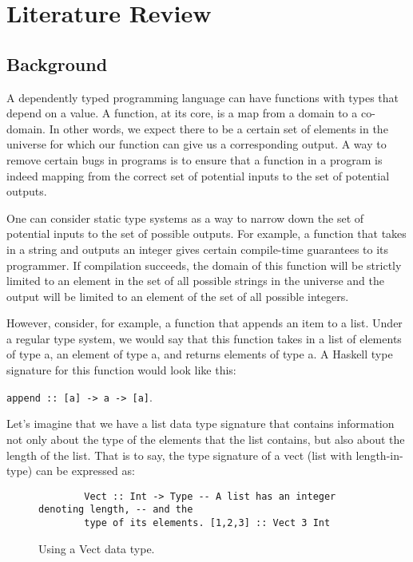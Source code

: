 
\chapter{Literature Review}

\section{Background}
A dependently typed programming language can have functions with types that
depend on a value. A function, at its core, is a map from a domain to a
co-domain. In other words, we expect there to be a certain set of elements in
the universe for which our function can give us a corresponding output. A way to
remove certain bugs in programs is to ensure that a function in a program is
indeed mapping from the correct set of potential inputs to the set of potential
outputs. 

One can consider static type systems as a way to narrow down the set of
potential inputs to the set of possible outputs. For example, a function that
takes in a string and outputs an integer gives certain compile-time guarantees
to its programmer. If compilation succeeds, the domain of this function will be
strictly limited to an element in the set of all possible strings in the
universe and the output will be limited to an element of the set of all possible
integers. 

However, consider, for example, a function that appends an item to a list. Under
a regular type system, we would say that this function takes in a list of
elements of type a, an element of type a, and returns elements of type a. A
Haskell type signature for this function would look like this: 

\texttt{append :: [a] -> a -> [a]}. 


Let's imagine that we have a list data type signature that contains information
not only about the type of the elements that the list contains, but also about
the length of the list. That is to say, the type signature of a vect (list with
length-in-type) can be expressed as: 

\begin{figure}
    \caption{Using a Vect data type.}
    \begin{lstlisting}
        Vect :: Int -> Type -- A list has an integer denoting length, -- and the
        type of its elements. [1,2,3] :: Vect 3 Int
    \end{lstlisting}
\end{figure} 


